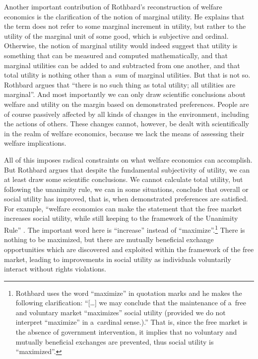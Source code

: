 Another important contribution of Rothbard's reconstruction of welfare economics is the clarification of the notion of marginal utility. He explains that the term does not refer to some marginal increment in utility, but rather to the utility of the marginal unit of some good, which is subjective and ordinal. Otherwise, the notion of marginal utility would indeed suggest that utility is something that can be measured and computed mathematically, and that marginal utilities can be added to and subtracted from one another, and that total utility is nothing other than a~sum of marginal utilities. But that is not so. Rothbard 
\parencite*[][p.301]{rothbard_toward_2011} %
 argues that ``there is no such thing as total utility; all utilities are marginal''. And most importantly we can only draw scientific conclusions about welfare and utility on the margin based on demonstrated preferences. People are of course passively affected by all kinds of changes in the environment, including the actions of others. These changes cannot, however, be dealt with scientifically in the realm of welfare economics, because we lack the means of assessing their welfare implications.



All of this imposes radical constraints on what welfare economics can accomplish. But Rothbard argues that despite the fundamental subjectivity of utility, we can at least draw some scientific conclusions. We cannot calculate total utility, but following the unanimity rule, we can in some situations, conclude that overall or social utility has improved, that is, when demonstrated preferences are satisfied. For example, ``welfare economics can make the statement that the free market increases social utility, while still keeping to the framework of the Unanimity Rule'' 
\parencite[][p.320]{rothbard_toward_2011}. %
 The important word here is ``increase'' instead of ``maximize''.\footnote{Rothbard 
\parencite*[][p.323]{} %
 uses the word ``maximize'' in quotation marks and he makes the following clarification: ``[…] we may conclude that the maintenance of a~free and voluntary market ``maximizes'' social utility (provided we do not interpret ``maximize'' in a~cardinal sense.).'' That is, since the free market is the absence of government intervention, it implies that no voluntary and mutually beneficial exchanges are prevented, thus social utility is ``maximized''.} There is nothing to be maximized, but there are mutually beneficial exchange opportunities which are discovered and exploited within the framework of the free market, leading to improvements in social utility as individuals voluntarily interact without rights violations.



